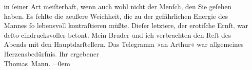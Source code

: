 \begin{ledgroupsized}[t]{13cm}
                    in ſeiner Art meiſter{\pb}haft, wenn auch
                    wohl nicht der Menſch, den Sie geſehen haben. Es fehlte die aeußere Weichheit,
                    die zu der gefährlichen Energie des Mannes ſo lebensvoll kontraſtieren müßte.
                    Dieſer letztere, der erotiſche Ernſt, war deſto eindrucksvoller betont. Mein Bruder und ich verbrachten
                    den Reſt des Abends \introOben{}mit\introOben{} den Hauptdarſtellern. Das
                    Telegramm »an Arthur« war allgemeines Herzensbedürfnis.\pend
           \pstart
           Ihr ergebener{\\[\baselineskip]}\spacefill\mbox{Thomas Mann.}\pend
           \leftskip=0em{}
         
         \endnumbering{}\end{ledgroupsized}  \newcommand{\dateiname}{L02039}\newcommand{\titel}{Thomas Mann an Arthur Schnitzler, 16. 10. 1911}\newcommand{\editorInnen}{Martin Anton Müller und Gerd-Hermann Susen}
      